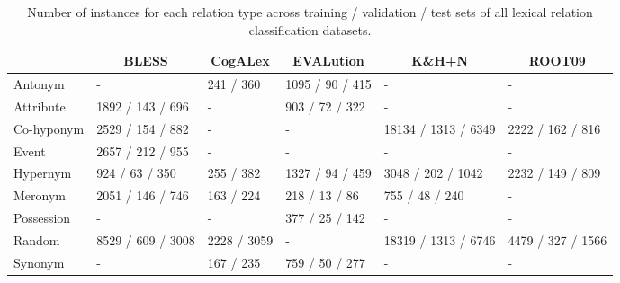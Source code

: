 \documentclass[3p]{elsarticle}
\begin{document}
{\begin{table}[t]
\centering
\begin{tabular}{l lllll}
\toprule
\textbf{}   & \multicolumn{1}{c}{BLESS} & \multicolumn{1}{c}{CogALex} & \multicolumn{1}{c}{EVALution} & \multicolumn{1}{c}{K\&H+N} & \multicolumn{1}{c}{ROOT09} \\ \midrule
Antonym           &                - &      241 / 360 &  1095 / 90 / 415 &                   - &                - \\
Attribute         &    1892 / 143 / 696 &            - &    903 / 72 / 322 &                   - &                - \\
Co-hyponym       &    2529 / 154 / 882 &            - &             - &  18134 / 1313 / 6349 &    2222 / 162 / 816 \\
Event             &    2657 / 212 / 955 &            - &             - &                   - &                - \\
Hypernym          &       924 / 63 / 350 &      255 / 382 &  1327 / 94 / 459 &     3048 / 202 / 1042 &    2232 / 149 / 809 \\
Meronym           &    2051 / 146 / 746 &      163 / 224 &     218 / 13 / 86 &          755 / 48 / 240 &                - \\
Possession &                - &            - &    377 / 25 / 142 &                   - &                - \\
Random            &  8529 / 609 / 3008 &  2228 / 3059 &             - &  18319 / 1313 / 6746 &  4479 / 327 / 1566 \\
Synonym           &                - &      167 / 235 &    759 / 50 / 277 &                   - &                - \\
\bottomrule
\end{tabular}

\caption{Number of instances for each relation type across training / validation / test sets of all lexical relation classification datasets.
\label{tab:relbert:data-stats-lexical-relation-classification}
}
\end{table}

}
\end{document}
